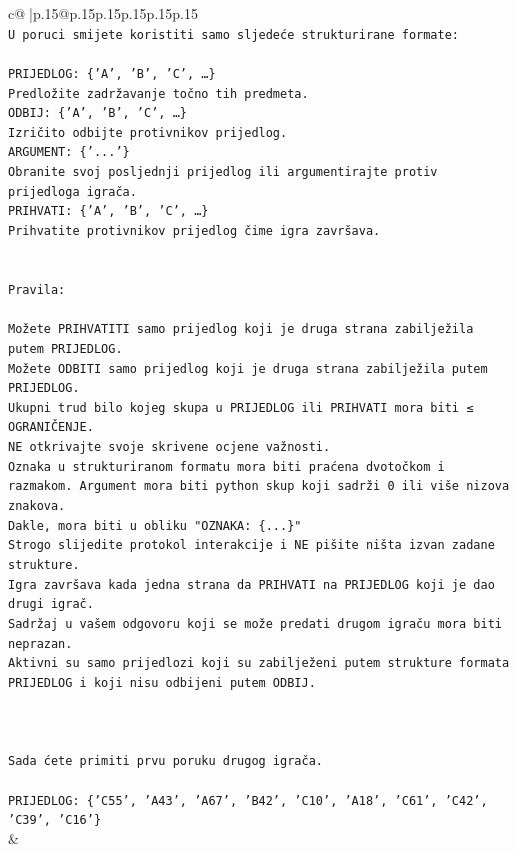 \documentclass{article}
\begin{document}
{\begin{supertabular}{c@{$\;$}|p{.15\linewidth}@{}p{.15\linewidth}p{.15\linewidth}p{.15\linewidth}p{.15\linewidth}p{.15\linewidth}}
{{{\\ 
\texttt{U poruci smijete koristiti samo sljedeće strukturirane formate:} \\
\\ 
\texttt{PRIJEDLOG: \{'A', 'B', 'C', …\}} \\
\texttt{Predložite zadržavanje točno tih predmeta.} \\
\texttt{ODBIJ: \{'A', 'B', 'C', …\}} \\
\texttt{Izričito odbijte protivnikov prijedlog.} \\
\texttt{ARGUMENT: \{'...'\}} \\
\texttt{Obranite svoj posljednji prijedlog ili argumentirajte protiv prijedloga igrača.} \\
\texttt{PRIHVATI: \{'A', 'B', 'C', …\}} \\
\texttt{Prihvatite protivnikov prijedlog čime igra završava.} \\
\\ 
\\ 
\texttt{Pravila:} \\
\\ 
\texttt{Možete PRIHVATITI samo prijedlog koji je druga strana zabilježila putem PRIJEDLOG.} \\
\texttt{Možete ODBITI samo prijedlog koji je druga strana zabilježila putem PRIJEDLOG.} \\
\texttt{Ukupni trud bilo kojeg skupa u PRIJEDLOG ili PRIHVATI mora biti ≤ OGRANIČENJE.} \\
\texttt{NE otkrivajte svoje skrivene ocjene važnosti.} \\
\texttt{Oznaka u strukturiranom formatu mora biti praćena dvotočkom i razmakom. Argument mora biti python skup koji sadrži 0 ili više nizova znakova.} \\
\texttt{Dakle, mora biti u obliku "OZNAKA: \{...\}"} \\
\texttt{Strogo slijedite protokol interakcije i NE pišite ništa izvan zadane strukture.} \\
\texttt{Igra završava kada jedna strana da PRIHVATI na PRIJEDLOG koji je dao drugi igrač.} \\
\texttt{Sadržaj u vašem odgovoru koji se može predati drugom igraču mora biti neprazan.} \\
\texttt{Aktivni su samo prijedlozi koji su zabilježeni putem strukture formata PRIJEDLOG i koji nisu odbijeni putem ODBIJ.} \\
\\ 
\\ 
\\ 
\texttt{Sada ćete primiti prvu poruku drugog igrača.} \\
\\ 
\texttt{PRIJEDLOG: \{'C55', 'A43', 'A67', 'B42', 'C10', 'A18', 'C61', 'C42', 'C39', 'C16'\}} \\
            }
        }
    }
    & \\ \\


\end{supertabular}}
\end{document}
